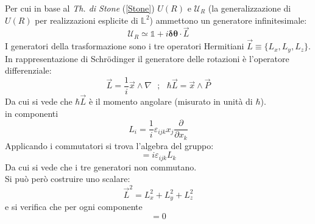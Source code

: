 \documentclass[twoside]{article}
\begin{document}
Per cui in base al \textit{Th. di Stone} (\ref{Stone}) $U(R)$ e $\mathcal{U}_R$ (la generalizzazione di $U(R)$ per realizzazioni esplicite di $\mathds{L}^2$) ammettono un generatore infinitesimale:
\begin{equation}
    \mathcal{U}_R\simeq \mathds{1}+i\bm{\delta \theta}\cdot \Vec{L}
\end{equation}
I generatori della trasformazione sono i tre operatori Hermitiani $\Vec{L}\equiv \{L_x,L_y,L_z\}$.
\\
In rappresentazione di Schr\"odinger il generatore delle rotazioni è l'operatore differenziale:
\begin{equation}\label{9.2.5}
    \Vec{L}=\frac{1}{i}\Vec{x}\wedge\nabla \ \ \ ; \ \ \ \hbar\Vec{L}=\Vec{x}\wedge\Vec{P}
\end{equation}
Da cui si vede che $\hbar \Vec{L}$ è il momento angolare (misurato in unità di $\hbar$).
\\
in componenti 
\begin{equation}
    L_i=\frac{1}{i}\varepsilon_{ijk}x_j\frac{\partial}{\partial x_k}
\end{equation}
Applicando i commutatori si trova l'algebra del gruppo:
\begin{equation}
    [L_i,L_j]=i \varepsilon_{ijk}L_k
\end{equation}
Da cui si vede che i tre generatori non commutano.
\\
Si può però costruire uno scalare:
\begin{equation}
    \Vec{L}^2=L_x ^2 +L_y ^2 +L_z ^2
\end{equation}
e si verifica che per ogni componente
\begin{equation}
    [L_i,\Vec{L}^2]=0
\end{equation}
\end{document}
